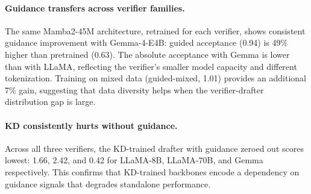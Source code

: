 \paragraph{Guidance transfers across verifier families.}
The same Mamba2-45M architecture, retrained for each verifier, shows consistent guidance improvement with Gemma-4-E4B: guided acceptance (0.94) is 49\% higher than pretrained (0.63).
The absolute acceptance with Gemma is lower than with LLaMA, reflecting the verifier's smaller model capacity and different tokenization.
Training on mixed data (guided-mixed, 1.01) provides an additional 7\% gain, suggesting that data diversity helps when the verifier-drafter distribution gap is large.

\paragraph{KD consistently hurts without guidance.}
Across all three verifiers, the KD-trained drafter with guidance zeroed out scores lowest: 1.66, 2.42, and 0.42 for LLaMA-8B, LLaMA-70B, and Gemma respectively.
This confirms that KD-trained backbones encode a dependency on guidance signals that degrades standalone performance.
